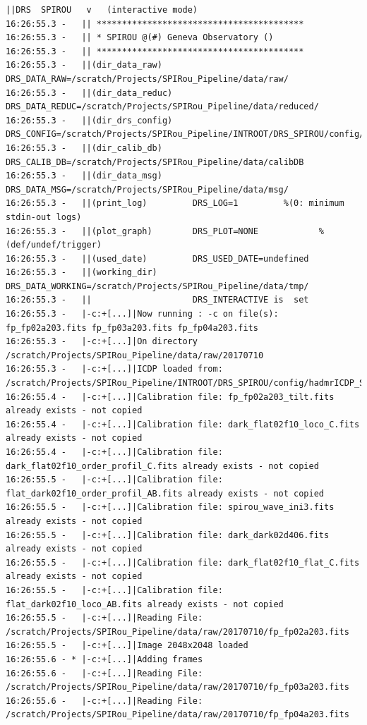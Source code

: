 \begin{lstlisting}[style=text]
||DRS  SPIROU   v   (interactive mode)
16:26:55.3 -   || *****************************************
16:26:55.3 -   || * SPIROU @(#) Geneva Observatory ()
16:26:55.3 -   || *****************************************
16:26:55.3 -   ||(dir_data_raw)      DRS_DATA_RAW=/scratch/Projects/SPIRou_Pipeline/data/raw/
16:26:55.3 -   ||(dir_data_reduc)    DRS_DATA_REDUC=/scratch/Projects/SPIRou_Pipeline/data/reduced/
16:26:55.3 -   ||(dir_drs_config)    DRS_CONFIG=/scratch/Projects/SPIRou_Pipeline/INTROOT/DRS_SPIROU/config/
16:26:55.3 -   ||(dir_calib_db)      DRS_CALIB_DB=/scratch/Projects/SPIRou_Pipeline/data/calibDB
16:26:55.3 -   ||(dir_data_msg)      DRS_DATA_MSG=/scratch/Projects/SPIRou_Pipeline/data/msg/
16:26:55.3 -   ||(print_log)         DRS_LOG=1         %(0: minimum stdin-out logs)
16:26:55.3 -   ||(plot_graph)        DRS_PLOT=NONE            %(def/undef/trigger)
16:26:55.3 -   ||(used_date)         DRS_USED_DATE=undefined
16:26:55.3 -   ||(working_dir)       DRS_DATA_WORKING=/scratch/Projects/SPIRou_Pipeline/data/tmp/
16:26:55.3 -   ||                    DRS_INTERACTIVE is  set
16:26:55.3 -   |-c:+[...]|Now running : -c on file(s):  fp_fp02a203.fits fp_fp03a203.fits fp_fp04a203.fits
16:26:55.3 -   |-c:+[...]|On directory /scratch/Projects/SPIRou_Pipeline/data/raw/20170710
16:26:55.3 -   |-c:+[...]|ICDP loaded from: /scratch/Projects/SPIRou_Pipeline/INTROOT/DRS_SPIROU/config/hadmrICDP_SPIROU.py
16:26:55.4 -   |-c:+[...]|Calibration file: fp_fp02a203_tilt.fits already exists - not copied
16:26:55.4 -   |-c:+[...]|Calibration file: dark_flat02f10_loco_C.fits already exists - not copied
16:26:55.4 -   |-c:+[...]|Calibration file: dark_flat02f10_order_profil_C.fits already exists - not copied
16:26:55.5 -   |-c:+[...]|Calibration file: flat_dark02f10_order_profil_AB.fits already exists - not copied
16:26:55.5 -   |-c:+[...]|Calibration file: spirou_wave_ini3.fits already exists - not copied
16:26:55.5 -   |-c:+[...]|Calibration file: dark_dark02d406.fits already exists - not copied
16:26:55.5 -   |-c:+[...]|Calibration file: dark_flat02f10_flat_C.fits already exists - not copied
16:26:55.5 -   |-c:+[...]|Calibration file: flat_dark02f10_loco_AB.fits already exists - not copied
16:26:55.5 -   |-c:+[...]|Reading File: /scratch/Projects/SPIRou_Pipeline/data/raw/20170710/fp_fp02a203.fits
16:26:55.5 -   |-c:+[...]|Image 2048x2048 loaded
16:26:55.6 - * |-c:+[...]|Adding frames
16:26:55.6 -   |-c:+[...]|Reading File: /scratch/Projects/SPIRou_Pipeline/data/raw/20170710/fp_fp03a203.fits
16:26:55.6 -   |-c:+[...]|Reading File: /scratch/Projects/SPIRou_Pipeline/data/raw/20170710/fp_fp04a203.fits

\end{lstlisting}
